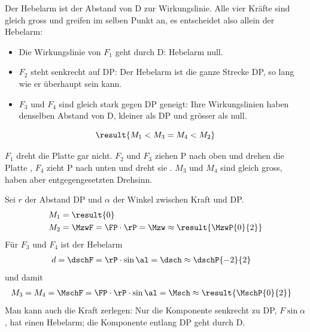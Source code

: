 \begin{abcliste}
\abc
Der Hebelarm ist der Abstand von D zur Wirkungslinie. Alle vier Kräfte sind gleich gross und greifen im selben Punkt an, es entscheidet also allein der Hebelarm:
\begin{itemize}
 \item Die Wirkungslinie von $F_1$ geht durch D: Hebelarm null.
 \item $F_2$ steht senkrecht auf DP: Der Hebelarm ist die ganze Strecke DP, so lang wie er überhaupt sein kann.
 \item $F_3$ und $F_4$ sind gleich stark gegen DP geneigt: Ihre Wirkungslinien haben denselben Abstand von D, kleiner als DP und grösser als null.
\end{itemize}
\[
 \result{M_1 < M_3 = M_4 < M_2}
\]

\abc
$F_1$ dreht die Platte gar nicht. $F_2$ und $F_3$ ziehen P nach oben und drehen die Platte , $F_4$ zieht P nach unten und dreht sie . $M_3$ und $M_4$ sind gleich gross, haben aber entgegengesetzten Drehsinn.

\abc
Sei $r$ der Abstand DP und $\alpha$ der Winkel zwischen Kraft und DP.
\begin{align}
 M_1 &= \result{0} \\
 M_2 &= \MzwF = \FP\cdot\rP = \Mzw \approx \result{\MzwP{0}{2}}
\end{align}
Für $F_3$ und $F_4$ ist der Hebelarm
\begin{align}
 d &= \dschF = \rP\cdot\sin\al = \dsch \approx \dschP{-2}{2}
\end{align}
und damit
\begin{align}
 M_3 = M_4 &= \MschF = \FP\cdot\rP\cdot\sin\al = \Msch \approx \result{\MschP{0}{2}}
\end{align}
Man kann auch die Kraft zerlegen: Nur die Komponente senkrecht zu DP, $F\sin\alpha$, hat einen Hebelarm; die Komponente entlang DP geht durch D.
\end{abcliste}
